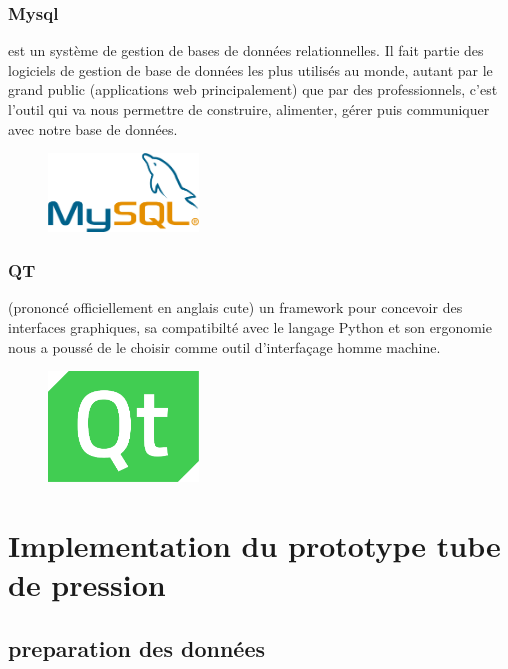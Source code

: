 \documentclass[11pt]{report}
\begin{document}
 \subsection{Mysql}
 est un système de gestion de bases de données relationnelles. Il fait partie des logiciels de gestion de base de données les plus utilisés au monde, autant par le grand public (applications web principalement) que par des professionnels, c'est l'outil qui va nous permettre de construire, alimenter, gérer puis communiquer avec notre base de données.
  \begin{figure}[H]
 	\begin{center}
 		\includegraphics[width=4cm]{images/mysql.png}
 		\label{fig:figure}
 	\end{center}
 \end{figure}
 
 \subsection{QT}

(prononcé officiellement en anglais cute) un framework pour concevoir des interfaces graphiques, sa compatibilté avec le langage Python et son ergonomie nous a poussé de le choisir comme outil d'interfaçage homme machine.


 \begin{figure}[H]
	\begin{center}
		\includegraphics[width=4cm]{images/qt.png}
		\label{fig:figure}
	\end{center}
\end{figure}

\chapter{Implementation du prototype tube de pression}

\section{preparation des données}
\end{document}
